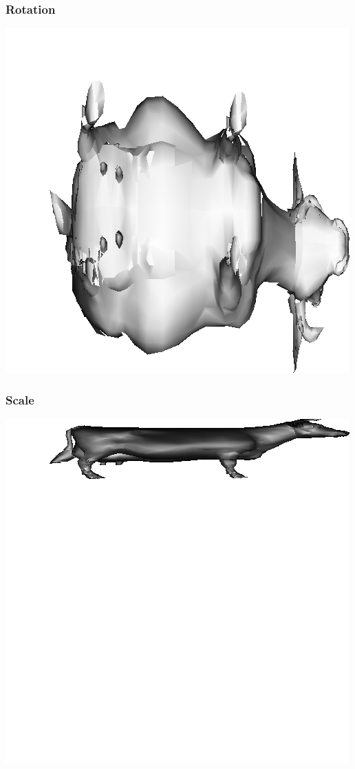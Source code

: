 \documentclass[11pt]{article}
\begin{document}
\subsubsection{Rotation}
\begin{center}\includegraphics{rotation}\end{center}
\subsubsection{Scale}
\begin{center}\includegraphics{scale}\end{center}
\end{document}
